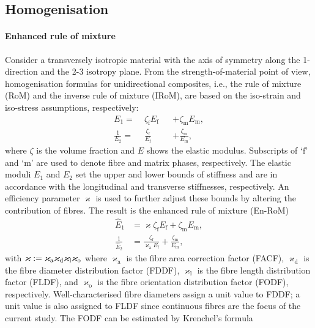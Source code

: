 \subsection{Homogenisation}
	\paragraph{Enhanced rule of mixture} Consider a transversely isotropic material with the axis of symmetry along the 1-direction and the 2-3 isotropy plane. From the strength-of-material point of view, homogenisation formulas for unidirectional composites, i.e., the rule of mixture (RoM) and the inverse rule of mixture (IRoM), are based on the iso-strain and iso-stress assumptions, respectively:
	\begin{subequations}
	\begin{alignat}{2}\label{eq:rom}
		E_1 		=\;& \zeta_\text{f}E_\text{f}          &&+\zeta_\text{m}E_\text{m},\\
		\frac{1}{E_2}	=\;& \frac{\zeta_\text{f}}{E_\text{f}} &&+ \frac{\zeta_\text{m}}{E_\text{m}},
	\end{alignat}
	\end{subequations}
	where $\zeta$ is the volume fraction and $E$ shows the elastic modulus. Subscripts of `$\text{f}$' and `$\text{m}$' are used to denote fibre and matrix phases, respectively. The elastic moduli $E_1$ and $E_2$ set the upper and lower bounds of stiffness and are in accordance with the longitudinal and transverse stiffnesses, respectively. An efficiency parameter $\varkappa$ is used to further adjust these bounds by altering the contribution of fibres. The result is the enhanced rule of mixture (En-RoM)~\autocite{Summerscales.2019} 
	\begin{subequations}
	\begin{alignat}{2}
		\hat{E}_1 &= \varkappa\zeta_\text{f}E_\text{f}+\zeta_\text{m}E_\text{m},\label{eq:enrom}\\
		\frac{1}{\hat{E}_2} &=\frac{\zeta_\text{f}}{\varkappa_\text{a} E_\text{f}}+ \frac{\zeta_\text{m}}{E_\text{m}},\label{eq:enirom}
	\end{alignat}
	\end{subequations}
	with $\varkappa \mathrel{:=} \varkappa_\text{a}\varkappa_\text{d}\varkappa_\text{l}\varkappa_\text{o}$ where $\varkappa_\text{a}$ is the fibre area correction factor (FACF), $\varkappa_\text{d}$ is the fibre diameter distribution factor (FDDF), $\varkappa_\text{l}$ is the fibre length distribution factor (FLDF), and $\varkappa_\text{o}$ is the fibre orientation distribution factor (FODF), respectively. Well-characterised fibre diameters assign a unit value to FDDF; a unit value is also assigned to FLDF since continuous fibres are the focus of the current study. The FODF can be estimated by Krenchel's formula~\autocite{Krenchel.1964}

